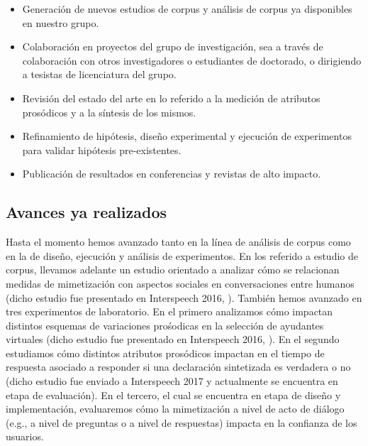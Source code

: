 \documentclass{article}
\begin{document}
\begin{itemize}

\item Generación de nuevos estudios de corpus y análisis de corpus ya disponibles en nuestro grupo.

\item Colaboración en proyectos del grupo de investigación, sea a través de colaboración con otros investigadores o estudiantes de doctorado, o dirigiendo a tesistas de licenciatura del grupo.

\item Revisión del estado del arte en lo referido a la medición de atributos prosódicos y a la síntesis de los mismos.

\item Refinamiento de hipótesis, diseño experimental y ejecución de experimentos para validar hipótesis pre-existentes.

\item Publicación de resultados en conferencias y revistas de alto impacto.

\end{itemize}

\subsection{Avances ya realizados}

Hasta el momento hemos avanzado tanto en la línea de análisis de corpus como en la de diseño, ejecución y análisis de experimentos. En los referido a estudio de corpus, llevamos adelante un estudio orientado a analizar cómo se relacionan medidas de mimetización con aspectos sociales en conversaciones entre humanos (dicho estudio fue presentado en Interspeech 2016, \cite{perez2016disentrainment}). También hemos avanzado en tres experimentos de laboratorio. En el primero analizamos cómo impactan distintos esquemas de variaciones prośodicas en la selección de ayudantes virtuales (dicho estudio fue presentado en Interspeech 2016, \cite{levitan2016implementing}). En el segundo estudiamos cómo distintos atributos prosódicos impactan en el tiempo de respuesta asociado a responder si una declaración sintetizada es verdadera o no (dicho estudio fue enviado a Interspeech 2017 y actualmente se encuentra en etapa de evaluación). En el tercero, el cual se encuentra en etapa de diseño y implementación, evaluaremos cómo la mimetización a nivel de acto de diálogo (e.g., a nivel de preguntas o a nivel de respuestas) impacta en la confianza de los usuarios.
\end{document}
